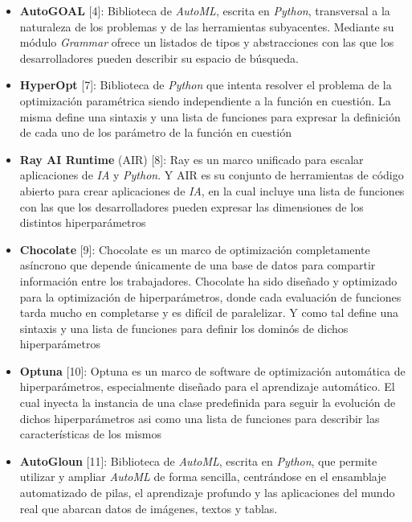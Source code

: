 \begin{itemize}

    \item  {\bf AutoGOAL} [4]: Biblioteca de {\it AutoML}, escrita en {\it Python}, transversal a la
          naturaleza de los problemas y de las herramientas subyacentes. Mediante su módulo {\it Grammar}
          ofrece un listados de tipos y abstracciones con las que los desarrolladores pueden describir
          su espacio de búsqueda.
    \item {\bf HyperOpt} [7]: Biblioteca de {\it Python} que intenta resolver el problema de la optimización
          paramétrica siendo independiente a la función en cuestión. La misma define una sintaxis y
          una lista de funciones para expresar la definición de cada uno de los parámetro de la
          función en cuestión
    \item {\bf Ray AI Runtime} (AIR) [8]: Ray es un marco unificado para escalar aplicaciones de {\it IA} y
              {\it Python}. Y AIR es su conjunto de herramientas de código abierto para crear aplicaciones de
              {\it IA}, en la cual incluye una lista de funciones con las que los desarrolladores pueden expresar
          las dimensiones de los distintos hiperparámetros
    \item {\bf Chocolate} [9]: Chocolate es un marco de optimización completamente asíncrono que depende
          únicamente de una base de datos para compartir información entre los trabajadores. Chocolate
          ha sido diseñado y optimizado para la optimización de hiperparámetros, donde cada evaluación
          de funciones tarda mucho en completarse y es difícil de paralelizar. Y como tal define una
          sintaxis y una lista de funciones para definir los dominós de dichos hiperparámetros
    \item {\bf Optuna} [10]: Optuna es un marco de software de optimización automática de hiperparámetros,
          especialmente diseñado para el aprendizaje automático. El cual inyecta la instancia de una
          clase predefinida para seguir la evolución de dichos hiperparámetros asi como
          una lista de funciones para describir las características de los mismos
    \item {\bf AutoGloun} [11]: Biblioteca de {\it AutoML}, escrita en {\it Python}, que permite utilizar y
          ampliar {\it AutoML} de forma sencilla, centrándose en el ensamblaje automatizado de pilas, el
          aprendizaje profundo y las aplicaciones del mundo real que abarcan datos de imágenes, textos y tablas.

\end{itemize}
